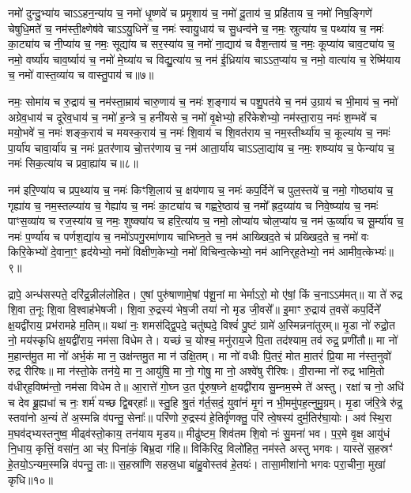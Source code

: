 नमो॑ दुन्दु॒भ्या॑य चाऽऽहन॒न्या॑य च॒ नमो॑ धृ॒ष्णवे॑ च प्रमृ॒शाय॑ च॒ नमो॑ दू॒ताय॑ च॒ प्रहि॑ताय च॒ नमो॑ निष॒ङ्गिणे॑ चेषुधि॒मते॑ च॒ नम॑स्ती॒क्ष्णेष॑वे चाऽऽयु॒धिने॑ च॒ नमः॑ स्वायु॒धाय॑ च सु॒धन्व॑ने च॒ नमः॒ स्रुत्या॑य च॒ पथ्या॑य च॒ नमः॑ का॒ट्या॑य च नी॒प्या॑य च॒ नमः॒ सूद्या॑य च सर॒स्या॑य च॒ नमो॑ ना॒द्याय॑ च वैश॒न्ताय॑ च॒ नमः॒ कूप्या॑य चाव॒ट्या॑य च॒ नमो॒ वर्ष्या॑य चाव॒र्ष्याय॑ च॒ नमो॑ मे॒घ्या॑य च विद्यु॒त्या॑य च॒ नम॑ ई॒ध्रिया॑य चाऽऽत॒प्या॑य च॒ नमो॒ वात्या॑य च॒ रेष्मि॑याय च॒ नमो॑ वास्त॒व्या॑य च वास्तु॒पाय॑ च॥७॥ 

नमः॒ सोमा॑य च रु॒द्राय॑ च॒ नम॑स्ता॒म्राय॑ चारु॒णाय॑ च॒ नमः॑ श॒ङ्गाय॑ च पशु॒पत॑ये च॒ नम॑ उ॒ग्राय॑ च भी॒माय॑ च॒ नमो॑ अग्रेव॒धाय॑ च दूरेव॒धाय॑ च॒ नमो॑ ह॒न्त्रे च॒ हनी॑यसे च॒ नमो॑ वृ॒क्षेभ्यो॒ हरि॑केशेभ्यो॒ नम॑स्ता॒राय॒ नमः॑  श॒म्भवे॑ च मयो॒भवे॑ च॒ नमः॑ शङ्क॒राय॑ च मयस्क॒राय॑ च॒ नमः॑ शि॒वाय॑ च शि॒वत॑राय च॒ नम॒स्तीर्थ्या॑य च॒ कूल्या॑य च॒ नमः॑ पा॒र्या॑य चावा॒र्या॑य च॒ नमः॑ प्र॒तर॑णाय चो॒त्तर॑णाय च॒ नम॑ आता॒र्या॑य चाऽऽला॒द्या॑य च॒ नमः॒ शष्प्या॑य च॒ फेन्या॑य च॒ नमः॑ सिक॒त्या॑य च प्रवा॒ह्या॑य च॥८॥ 

नम॑ इरि॒ण्या॑य च प्रप॒थ्या॑य च॒ नमः॑ किꣳशि॒लाय॑ च॒ क्षय॑णाय च॒ नमः॑ कप॒र्दिने॑ च पुल॒स्तये॑ च॒ नमो॒ गोष्ठ्या॑य च॒ गृह्या॑य च॒ नम॒स्तल्प्या॑य च॒ गेह्या॑य च॒ नमः॑ का॒ट्या॑य च गह्वरे॒ष्ठाय॑ च॒ नमो᳚ ह्रद॒य्या॑य च निवे॒ष्प्या॑य च॒ नमः॑ पाꣳस॒व्या॑य च रज॒स्या॑य च॒ नमः॒ शुष्क्या॑य च हरि॒त्या॑य च॒ नमो॒ लोप्या॑य चोल॒प्या॑य च॒ नम॑ ऊ॒र्व्या॑य च सू॒र्म्या॑य च॒ नमः॑ प॒र्ण्या॑य च पर्णश॒द्या॑य च॒ नमो॑ऽपगु॒रमा॑णाय चाभिघ्न॒ते च॒ नम॑ आख्खिद॒ते च॑ प्रख्खिद॒ते च॒ नमो॑ वः किरि॒केभ्यो॑ दे॒वाना॒ꣳ॒ हृद॑येभ्यो॒ नमो॑ विक्षीण॒केभ्यो॒ नमो॑ विचिन्व॒त्केभ्यो॒ नम॑ आनिर्‌ह॒तेभ्यो॒ नम॑ आमीव॒त्केभ्यः॑॥९॥ 

द्रापे॒ अन्ध॑सस्पते॒ दरि॑द्र॒न्नील॑लोहित। ए॒षां पुरु॑षाणामे॒षां प॑शू॒नां मा भेर्माऽरो॒ मो ए॑षां॒ किं च॒नाऽऽम॑मत्॥ या ते॑ रुद्र शि॒वा त॒नूः शि॒वा वि॒श्वाह॑भेषजी। शि॒वा रु॒द्रस्य॑ भेष॒जी तया॑ नो मृड जी॒वसे᳚॥ इ॒माꣳ रु॒द्राय॑ त॒वसे॑ कप॒र्दिने᳚ क्ष॒यद्वी॑राय॒ प्रभ॑रामहे म॒तिम्॥ यथा॑ नः॒ शमस॑द्द्वि॒पदे॒ चतु॑ष्पदे॒ विश्वं॑ पु॒ष्टं ग्रामे॑ अ॒स्मिन्नना॑तुरम्॥ मृ॒डा नो॑ रुद्रो॒त नो॒ मय॑स्कृधि क्ष॒यद्वी॑राय॒ नम॑सा विधेम ते। यच्छं च॒ योश्च॒ मनु॑राय॒जे पि॒ता तद॑श्याम॒ तव॑ रुद्र॒ प्रणी॑तौ॥ मा नो॑ म॒हान्त॑मु॒त मा नो॑ अर्भ॒कं मा न॒ उक्ष॑न्तमु॒त मा न॑ उक्षि॒तम्। मा नो॑ वधीः पि॒तरं॒ मोत मा॒तरं॑ प्रि॒या मा न॑स्त॒नुवो॑ रुद्र रीरिषः॥ मा न॑स्तो॒के तन॑ये॒ मा न॒ आयु॑षि॒ मा नो॒ गोषु॒ मा नो॒ अश्वे॑षु रीरिषः। वी॒रान्मा नो॑ रुद्र भामि॒तो व॑धीर्‌ह॒विष्म॑न्तो॒ नम॑सा विधेम ते॥ आ॒रात्ते॑ गो॒घ्न उ॒त पू॑रुष॒घ्ने क्ष॒यद्वी॑राय सु॒म्नम॒स्मे ते॑ अस्तु। रक्षा॑ च नो॒ अधि॑ च देव ब्रू॒ह्यधा॑ च नः॒ शर्म॑ यच्छ द्वि॒बर्‌हाः᳚॥ स्तु॒हि श्रु॒तं ग॑र्त॒सदं॒ युवा॑नं मृ॒गं न भी॒ममु॑पह॒त्नुमु॒ग्रम्। मृ॒डा ज॑रि॒त्रे रु॑द्र॒ स्तवा॑नो अ॒न्यं ते॑ अ॒स्मन्नि व॑पन्तु॒ सेनाः᳚॥ परि॑णो रु॒द्रस्य॑ हे॒तिर्वृ॑णक्तु॒ परि॑ त्वे॒षस्य॑ दुर्म॒तिर॑घा॒योः। अव॑ स्थि॒रा म॒घव॑द्भ्यस्तनुष्व॒ मीढ्व॑स्तो॒काय॒ तन॑याय मृडय॥ मीढु॑ष्टम॒ शिव॑तम शि॒वो नः॑ सु॒मना॑ भव। प॒र॒मे वृ॒क्ष आयु॑धं नि॒धाय॒ कृत्तिं॒ वसा॑न॒ आ च॑र॒ पिना॑कं॒ बिभ्र॒दा ग॑हि॥ विकि॑रिद॒ विलो॑हित॒ नम॑स्ते अस्तु भगवः। यास्ते॑ स॒हस्रꣳ॑ हे॒तयो॒ऽन्यम॒स्मन्नि व॑पन्तु॒ ताः॥ स॒हस्रा॑णि सहस्र॒धा बा॑हु॒वोस्तव॑ हे॒तयः॑। तासा॒मीशा॑नो भगवः परा॒चीना॒ मुखा॑ कृधि॥१०॥ 

